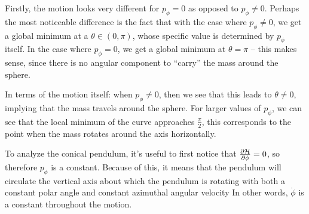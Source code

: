 \documentclass[10pt]{article}
\begin{document}
\begin{enumerate}[label=\alph*)]
			\begin{solution}
				Firstly, the motion looks very different for $p_\phi = 0$ as opposed to $p_\phi \neq 0$. 
				Perhaps the most noticeable difference is the fact that with the case where $p_\phi \neq 0$, 
				we get a global minimum at a $\theta \in (0, \pi)$, whose specific value is determined by 
				$p_\phi$ itself. In the case where $p_\phi = 0$, we get a global minimum at $\theta = \pi$ --
				this makes sense, since there is no angular component to ``carry'' the mass around the 
				sphere.
				
				In terms of the motion itself: when $p_\phi \neq 0$, then we see that this leads to $\theta 
				\neq 0$, implying that the mass travels around the sphere. For larger values of $p_\phi$, 
				we can see that the local minimum of the curve approaches $\frac{\pi}{2}$, this corresponds to 
				the point when the mass rotates around the axis horizontally.
				
				To analyze the conical pendulum, it's useful to first notice that $\pdv{\mathcal H}{\phi} = 0$,
				so therefore $p_\phi$ is a constant. 
				Because of this, it means that the pendulum will circulate the vertical axis about which
				the pendulum is rotating with both a constant polar angle and constant azimuthal angular velocity
				In other words, $\dot \phi$ is a constant throughout the motion.
			\end{solution}
	\end{enumerate}
\end{document}
